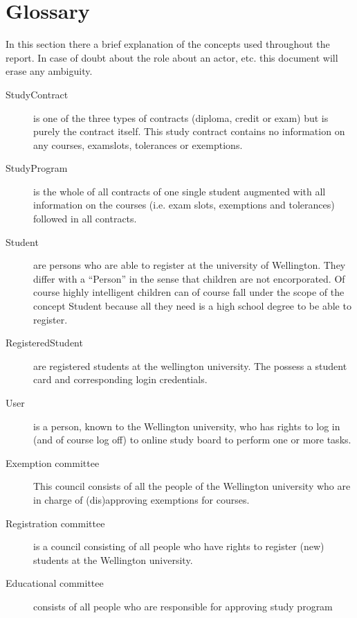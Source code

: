 \chapter{Glossary}
\label{glossary}

\npar In this section there a brief explanation of the concepts used throughout
the report. In case of doubt about the role about an actor, etc. this document
will erase any ambiguity.

\begin{description}
\item[]
\item[StudyContract] is one of the three types of contracts (diploma, credit or
exam) but is purely the contract itself. This study contract contains no
information on any courses, examslots, tolerances or exemptions.
\item[StudyProgram] is the whole of all contracts of one single student
augmented with all information on the courses (i.e. exam slots, exemptions and
tolerances) followed in all contracts.
\item[Student] are persons who are able to register at the university of
Wellington. They differ with a ``Person'' in the sense that children are
not encorporated. Of course highly intelligent children can of course fall under
the scope of the concept Student because all they need is a high school degree
to be able to register.
\item[RegisteredStudent] are registered students at the wellington university.
The possess a student card and corresponding login credentials.
\item[User] is a person, known to the Wellington university, who has rights to
log in (and of course log off) to online study board to perform one or more
tasks.
\item[Exemption committee] This council consists of all the people of the
Wellington university who are in charge of (dis)approving exemptions for
courses.
\item[Registration committee] is a council consisting of all people who have
rights to register (new) students at the Wellington university.
\item[Educational committee] consists of all people who are responsible for
approving study program
\end{description}
